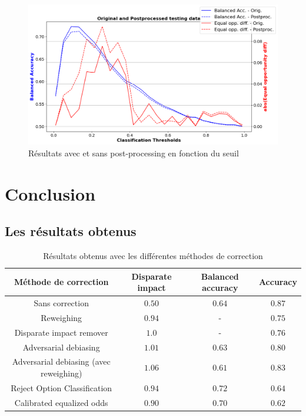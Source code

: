 \documentclass{article}
\begin{document}
    \begin{figure}[h]
        \centering
        \includegraphics[width=\textwidth]{./img/cal_equ_odds.png}
        \caption{Résultats avec et sans post-processing en fonction du seuil}
        \label{fig:EQU_odds}
    \end{figure}
    \vspace{3cm}

    \newpage
    \section{Conclusion}

    \subsection{Les résultats obtenus}
    \begin{center}
        \begin{table}[h]
            \begin{tabular}{ |c c c c| }
                \hline
                \textbf{Méthode de correction} & \textbf{Disparate impact} & \textbf{Balanced accuracy} & \textbf{Accuracy} \\
                \hline
                Sans correction & $0.50$ & $0.64$ & $0.87$ \\
                \hline
                Reweighing & $0.94$ & - & $0.75$ \\
                \hline
                Disparate impact remover & $1.0$ & - & $0.76$ \\
                \hline
                Adversarial debiasing & $1.01$ & $0.63$ & $0.80$ \\
                \hline
                Adversarial debiasing (avec reweighing) & $1.06$ & $0.61$ & $0.83$ \\
                \hline
                Reject Option Classification & $0.94$ & $0.72$ & $0.64$ \\
                \hline
                Calibrated equalized odds & $0.90$ & $0.70$ & $0.62$ \\
                \hline
            \end{tabular}
            \caption{Résultats obtenus avec les différentes méthodes de correction}
            \label{tab:results}
        \end{table}
        
    \end{center}
\end{document}

